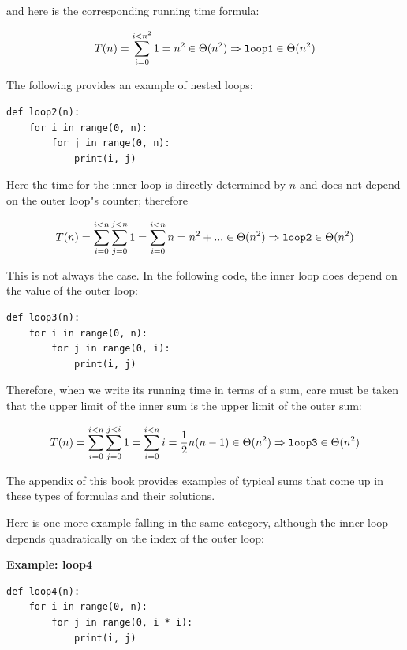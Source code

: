 \documentclass[justified, sixbynine]{tufte-book}
\def\subsubsection#1{{\bf #1}}
\theoremstyle{plain}%
\newtheorem * {corollary}{Corollary}
\theoremstyle{definition}
\theoremstyle{remark}
\newtheorem * {remark}{Remark}
\newtheorem * {note}{Note}
\begin{document}
\begin{fullwidth}
and here is the corresponding running time formula:

\begin{equation}
T(n)=\sum_{i=0}^{i<n^2}1=n^2\in \Theta (n^2)\Rightarrow \text{{\tt loop1}}%
\in \Theta (n^2)
\end{equation}

The following provides an example of nested loops:

\begin{lstlisting}
def loop2(n):
    for i in range(0, n):
        for j in range(0, n):
            print(i, j)
\end{lstlisting}

Here the time for the inner loop is directly determined by $n$ and does not depend on the outer loop"s counter; therefore

\begin{equation}
T(n)=\sum_{i=0}^{i<n}\sum_{j=0}^{j<n}1=\sum_{i=0}^{i<n}n=n^2+...\in \Theta
(n^2)\Rightarrow \text{{\tt loop2}}\in \Theta (n^2)
\end{equation}

This is not always the case. In the following code, the inner loop does depend on the value of the outer loop:

\begin{lstlisting}
def loop3(n):
    for i in range(0, n):
        for j in range(0, i):
            print(i, j)
\end{lstlisting}

Therefore, when we write its running time in terms of a sum, care must be taken that the upper limit of the inner sum is the upper limit of the outer sum:

\begin{equation}
T(n)=\sum_{i=0}^{i<n}\sum_{j=0}^{j<i}1=\sum_{i=0}^{i<n}i=\frac 12n(n-1)\in
\Theta (n^2)\Rightarrow \text{{\tt loop3}}\in \Theta (n^2)
\end{equation}

The appendix of this book provides examples of typical sums that come up in these types of formulas and their solutions.

Here is one more example falling in the same category, although the inner loop depends quadratically on the index of the outer loop:

\subsubsection{Example: loop4}
\begin{lstlisting}
def loop4(n):
    for i in range(0, n):
        for j in range(0, i * i):
            print(i, j)
\end{lstlisting}


\end{fullwidth}
\end{document}
